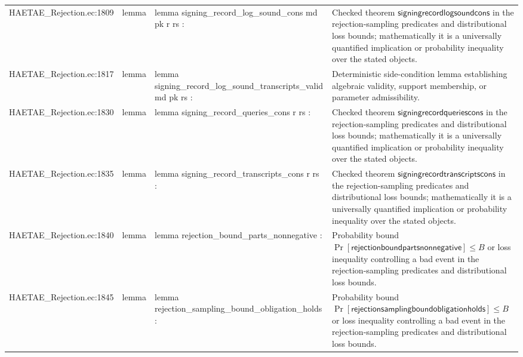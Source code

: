 \documentclass[10pt]{article}
\begin{document}
\begin{longtable}{L{0.11\textwidth}L{0.055\textwidth}L{0.385\textwidth}L{0.41\textwidth}}
HAETAE\_\allowbreak{}Rejection.\allowbreak{}ec:\allowbreak{}1809 & lemma & {\ttfamily\scriptsize lemma signing\_\allowbreak{}record\_\allowbreak{}log\_\allowbreak{}sound\_\allowbreak{}cons md pk r rs :} & Checked theorem $\mathsf{signingrecordlogsoundcons}$ in the rejection-sampling predicates and distributional loss bounds; mathematically it is a universally quantified implication or probability inequality over the stated objects. \\
HAETAE\_\allowbreak{}Rejection.\allowbreak{}ec:\allowbreak{}1817 & lemma & {\ttfamily\scriptsize lemma signing\_\allowbreak{}record\_\allowbreak{}log\_\allowbreak{}sound\_\allowbreak{}transcripts\_\allowbreak{}valid md pk rs :} & Deterministic side-condition lemma establishing algebraic validity, support membership, or parameter admissibility. \\
HAETAE\_\allowbreak{}Rejection.\allowbreak{}ec:\allowbreak{}1830 & lemma & {\ttfamily\scriptsize lemma signing\_\allowbreak{}record\_\allowbreak{}queries\_\allowbreak{}cons r rs :} & Checked theorem $\mathsf{signingrecordqueriescons}$ in the rejection-sampling predicates and distributional loss bounds; mathematically it is a universally quantified implication or probability inequality over the stated objects. \\
HAETAE\_\allowbreak{}Rejection.\allowbreak{}ec:\allowbreak{}1835 & lemma & {\ttfamily\scriptsize lemma signing\_\allowbreak{}record\_\allowbreak{}transcripts\_\allowbreak{}cons r rs :} & Checked theorem $\mathsf{signingrecordtranscriptscons}$ in the rejection-sampling predicates and distributional loss bounds; mathematically it is a universally quantified implication or probability inequality over the stated objects. \\
HAETAE\_\allowbreak{}Rejection.\allowbreak{}ec:\allowbreak{}1840 & lemma & {\ttfamily\scriptsize lemma rejection\_\allowbreak{}bound\_\allowbreak{}parts\_\allowbreak{}nonnegative :} & Probability bound $\Pr[\mathsf{rejectionboundpartsnonnegative}]\le B$ or loss inequality controlling a bad event in the rejection-sampling predicates and distributional loss bounds. \\
HAETAE\_\allowbreak{}Rejection.\allowbreak{}ec:\allowbreak{}1845 & lemma & {\ttfamily\scriptsize lemma rejection\_\allowbreak{}sampling\_\allowbreak{}bound\_\allowbreak{}obligation\_\allowbreak{}holds :} & Probability bound $\Pr[\mathsf{rejectionsamplingboundobligationholds}]\le B$ or loss inequality controlling a bad event in the rejection-sampling predicates and distributional loss bounds. \\

\end{longtable}
\end{document}
